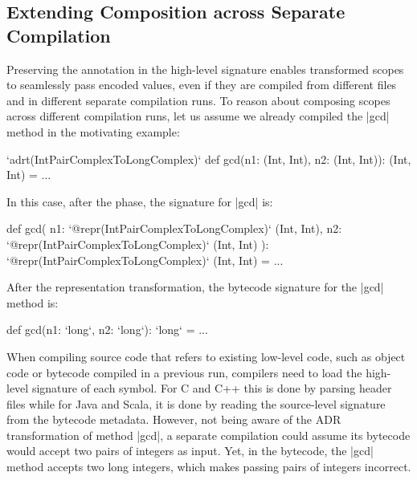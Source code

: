 \subsection{Extending Composition across Separate Compilation}
\label{sec:ildl:separate-compilation}

Preserving the annotation in the high-level signature enables transformed scopes to seamlessly pass encoded values, even if they are compiled from different files and in different separate compilation runs. To reason about composing scopes across different compilation runs, let us assume we already compiled the |gcd| method in the motivating example:

\begin{lstlisting-nobreak}
`adrt(IntPairComplexToLongComplex)` {
  def gcd(n1: (Int, Int), n2: (Int, Int)): (Int, Int) = ...
}
\end{lstlisting-nobreak}

In this case, after the \inject{} phase, the signature for |gcd| is:

\begin{lstlisting-nobreak}
def gcd(
    n1: `@repr(IntPairComplexToLongComplex)` (Int, Int),
    n2: `@repr(IntPairComplexToLongComplex)` (Int, Int)
  ): `@repr(IntPairComplexToLongComplex)` (Int, Int) = ...
\end{lstlisting-nobreak}

After the representation transformation, the bytecode signature for the |gcd| method is:

\begin{lstlisting-nobreak}
def gcd(n1: `long`, n2: `long`): `long` = ...
\end{lstlisting-nobreak}

When compiling source code that refers to existing low-level code, such as object code or bytecode compiled in a previous run, compilers need to load the high-level signature of each symbol. For C and C++ this is done by parsing header files while for Java and Scala, it is done by reading the source-level signature from the bytecode metadata. However, not being aware of the ADR transformation of method |gcd|, a separate compilation could assume its bytecode would accept two pairs of integers as input. Yet, in the bytecode, the |gcd| method accepts two long integers, which makes passing pairs of integers incorrect.

